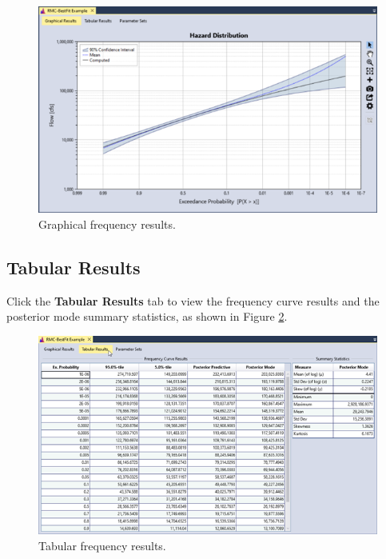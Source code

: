 \documentclass[
]{book}
\begin{document}
\begin{figure}

{\centering \includegraphics{images/figure56} 

}

\caption{Graphical frequency results.}\label{fig:figure-56}
\end{figure}

\hypertarget{tabular-results}{%
\subsection{Tabular Results}\label{tabular-results}}

Click the \textbf{Tabular Results} tab to view the frequency curve results and the posterior mode summary statistics, as shown in Figure \ref{fig:figure-57}.

\begin{figure}

{\centering \includegraphics{images/figure57} 

}

\caption{Tabular frequency results.}\label{fig:figure-57}
\end{figure}
\end{document}
